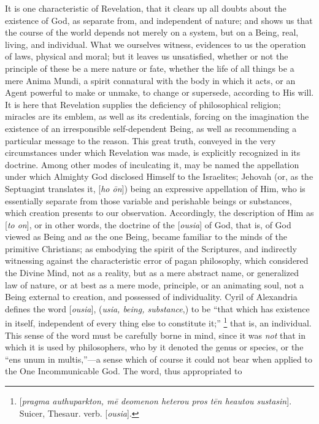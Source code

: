 It is one characteristic of Revelation, that it clears up all
doubts about the existence of God, as separate from, and independent
of nature; and shows us that the course of the world depends not
merely on a system, but on a Being, real, living, and individual. What
we ourselves witness, evidences to us the operation of laws, physical
and moral; but it leaves us unsatisfied, whether or not the principle
of these be a mere nature or fate, whether the life of all things be a
mere Anima Mundi, a spirit connatural with the body in which it
acts, or an Agent powerful to make or unmake, to change or supersede,
according to His will. It is here that Revelation supplies the
deficiency of philosophical religion; miracles are its emblem, as well
as its credentials, forcing on the imagination the existence of an
irresponsible self-dependent Being, as well as recommending a
particular message to the reason. This great truth, conveyed in the
very circumstances under which Revelation was made, is explicitly
recognized in its doctrine. Among other modes of inculcating it, may
be named the appellation under which Almighty God disclosed Himself to
the Israelites; Jehovah (or, as the Septuagint translates it, [\emph{ho \={o}n}])
being an expressive appellation of Him, who is essentially separate
from those variable and perishable beings or substances, which
creation presents to our observation. Accordingly, the description of
Him as [\emph{to on}], or in other words, the doctrine of the [\emph{ousia}]
of God, that is, of God viewed as Being and as the one Being, became
familiar to the minds of the primitive Christians; as embodying the
spirit of the Scriptures, and indirectly witnessing against the
characteristic error of pagan philosophy, which considered the Divine
Mind, not as a reality, but as a mere abstract name, or generalized
law of nature, or at best as a mere mode, principle, or an animating
soul, not a Being external to creation, and possessed of
individuality. Cyril of Alexandria defines the word [\emph{ousia}], (\emph{usia,
being, substance},) to be ``that which has existence in itself,
independent of every thing else to constitute it;'' \footnote{[\emph{pragma authuparkton, m\={e}
deomenon heterou pros t\={e}n heautou sustasin}]. Suicer,
Thesaur. verb. [\emph{ousia}].} that is, an individual. This sense of the word must be
carefully borne in mind, since it was \emph{not} that in which it is used by
philosophers, who by it denoted the genus or species, or the ``ens
unum in multis,''—a sense which of course it could not bear when
applied to the One Incommunicable God. The word, thus appropriated to
